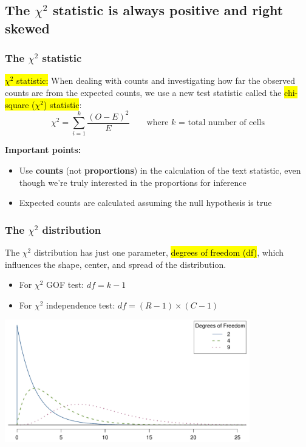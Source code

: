 \documentclass[11pt,containsverbatim,handout,xcolor=xelatex,dvipsnames,table]{beamer}
\begin{document}

\subsection{The $\chi^2$ statistic is always positive and right skewed}
\label{mi2}


\begin{frame}
\frametitle{The $\chi^2$ statistic}

\hl{$\chi^2$ statistic:} When dealing with counts and investigating how far the observed counts are from the expected counts, we use a new test statistic called the \hl{chi-square ($\chi^2$) statistic}:
\[\chi^2 = \sum_{i = 1}^k \frac{(O - E)^2}{E} \qquad \text{where $k$ = total number of cells} \]

\textbf{Important points:}
\begin{itemize}
\item Use \textbf{counts} (not \textbf{proportions}) in the calculation of the text statistic, even though we're truly interested in the proportions for inference
\item Expected counts are calculated assuming the null hypothesis is true
\end{itemize}

\end{frame}


\begin{frame}
\frametitle{The $\chi^2$ distribution}

The $\chi^2$ distribution has just one parameter, \hl{degrees of freedom (df)}, which influences the shape, center, and spread of the distribution.
\begin{itemize}
\item For $\chi^2$ GOF test: $df = k - 1$ \\
\item For $\chi^2$ independence test: $df = (R-1) \times (C-1)$ 
\end{itemize}

\pause

\begin{center}
\includegraphics[width=0.8\textwidth]{figures/chiSquareDistributionWithInceasingDF/chiSquareDistributionWithInceasingDF}
\end{center}

\end{frame}
\end{document}
